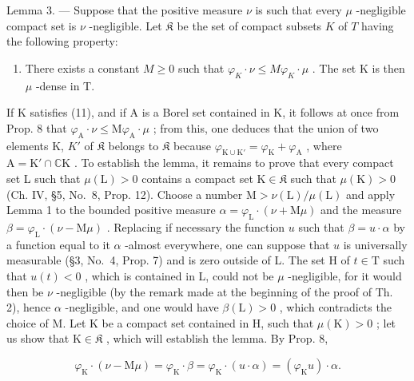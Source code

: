 Lemma 3. --- Suppose that the positive measure \(\nu\) is such that every \(\mu\) -negligible compact set is \(\nu\) -negligible. Let \(\mathfrak{K}\) be the set of compact subsets \(K\) of \(T\) having the following property:

\begin{enumerate}
\def\labelenumi{(\arabic{enumi})}
\setcounter{enumi}{10}
\tightlist
\item
  There exists a constant \(M \geqslant 0\) such that \(\varphi_{K} \cdot \nu \leqslant M \varphi_{K} \cdot \mu\) . The set K is then \(\mu\) -dense in T.
\end{enumerate}

If K satisfies (11), and if A is a Borel set contained in K, it follows at once from Prop. 8 that \(\varphi_{\mathrm{A}} \cdot \nu \leqslant \mathrm{M}\varphi_{\mathrm{A}} \cdot \mu\) ; from this, one deduces that the union of two elements K, \(K'\) of \(\mathfrak{K}\) belongs to \(\mathfrak{K}\) because \(\varphi_{\mathrm{K} \cup \mathrm{K}'} = \varphi_{\mathrm{K}} + \varphi_{\mathrm{A}}\) , where \(\mathrm{A} = \mathrm{K}' \cap \mathbb{C}\mathrm{K}\) . To establish the lemma, it remains to prove that every compact set L such that \(\mu(\mathrm{L}) > 0\) contains a compact set \(\mathrm{K} \in \mathfrak{K}\) such that \(\mu(\mathrm{K}) > 0\) (Ch. IV, §5, No.~8, Prop. 12). Choose a number \(\mathrm{M} > \nu(\mathrm{L}) / \mu(\mathrm{L})\) and apply Lemma 1 to the bounded positive measure \(\alpha = \varphi_{\mathrm{L}} \cdot (\nu + \mathrm{M}\mu)\) and the measure \(\beta = \varphi_{\mathrm{L}} \cdot (\nu - \mathrm{M}\mu)\) . Replacing if necessary the function \(u\) such that \(\beta = u \cdot \alpha\) by a function equal to it \(\alpha\) -almost everywhere, one can suppose that \(u\) is universally measurable (§3, No.~4, Prop. 7) and is zero outside of L. The set H of \(t \in \mathrm{T}\) such that \(u(t) < 0\) , which is contained in L, could not be \(\mu\) -negligible, for it would then be \(\nu\) -negligible (by the remark made at the beginning of the proof of Th. 2), hence \(\alpha\) -negligible, and one would have \(\beta(\mathrm{L}) > 0\) , which contradicts the choice of M. Let K be a compact set contained in H, such that \(\mu(\mathrm{K}) > 0\) ; let us show that \(\mathrm{K} \in \mathfrak{K}\) , which will establish the lemma. By Prop. 8,

\[
\varphi_ {\mathrm{K}} \cdot (\nu - \mathrm{M} \mu) = \varphi_ {\mathrm{K}} \cdot \beta = \varphi_ {\mathrm{K}} \cdot (u \cdot \alpha) = (\varphi_ {\mathrm{K}} u) \cdot \alpha .
\]

